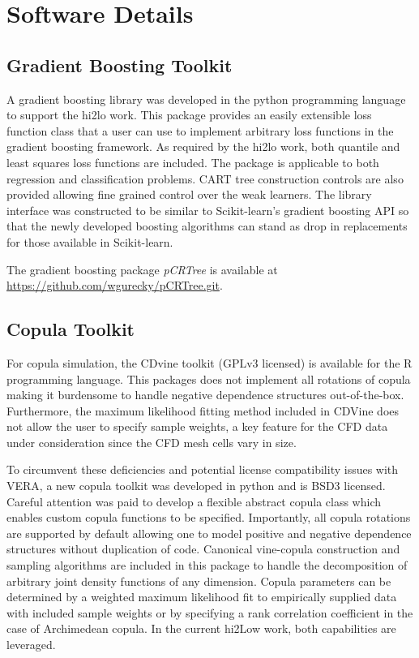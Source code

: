 
\section{Software Details}

\subsection{Gradient Boosting Toolkit}

A gradient boosting library was developed in the python programming language to support the hi2lo work.  This package provides an easily extensible loss function class that a user can use to implement arbitrary loss functions in the gradient boosting framework.  As required by the hi2lo work, both quantile and least squares loss functions are included.  The package is applicable to both regression and classification problems.  CART tree construction controls are also provided allowing fine grained control over the weak learners.
The library interface was constructed to be similar to Scikit-learn's gradient boosting API so that the newly developed boosting algorithms can stand as drop in replacements for those available in Scikit-learn.

The gradient boosting package \emph{pCRTree} is available at \url{https://github.com/wgurecky/pCRTree.git}.

\subsection{Copula Toolkit}

For copula simulation, the CDvine toolkit (GPLv3 licensed) is available for the R programming language. This packages does not implement all rotations of copula making it burdensome to handle negative dependence structures out-of-the-box.  Furthermore, the maximum likelihood fitting method included in CDVine does not allow the user to specify sample weights, a key feature for the CFD data under consideration since the CFD mesh cells vary in size.

To circumvent these deficiencies and potential license compatibility issues with VERA, a new copula toolkit was developed in python and is BSD3 licensed.
Careful attention was paid to develop a flexible abstract copula class which enables custom copula functions to be specified.  Importantly, all copula rotations are supported by default allowing one to model positive and negative dependence structures without duplication of code.
Canonical vine-copula construction and sampling algorithms are included in this package to handle the decomposition of arbitrary joint density functions of any dimension.
Copula parameters can be determined by a weighted maximum likelihood fit to empirically supplied data with included sample weights or by specifying a rank correlation coefficient in the case of Archimedean copula.  In the current hi2Low work, both capabilities are leveraged.

